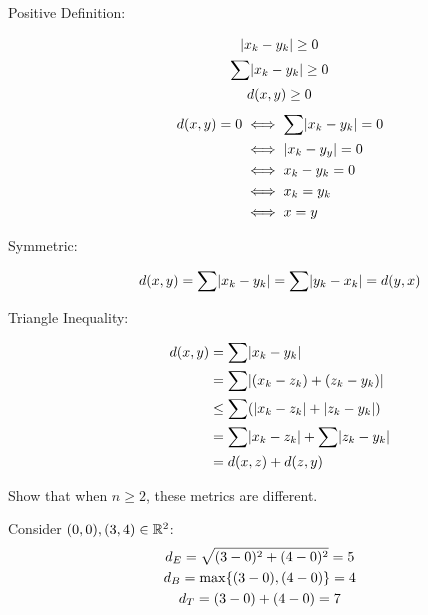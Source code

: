 \documentclass[letterpaper,12pt,fleqn]{article}
\begin{document}
\begin{examples}[Exercise 9.1]
\begin{enumerate}
    \begin{description}
    \item[Positive Definition:]
      \begin{gather*}
        \lvert x_k-y_k\rvert\ge0 \\
        \sum\lvert x_k-y_k\rvert\ge0 \\
        d(x,y)\ge0
      \end{gather*}
      \begin{align*}
        d(x,y)=0 &\iff \sum\lvert x_k-y_k\rvert=0 \\
        &\iff \lvert x_k-y_y\rvert=0 \\
        &\iff x_k-y_k=0 \\
        &\iff x_k=y_k \\
        &\iff x=y
      \end{align*}
    \item[Symmetric:]
      \[d(x,y)=\sum\lvert x_k-y_k\rvert=\sum\lvert y_k-x_k\rvert=d(y,x)\]
    \item[Triangle Inequality:]
      \begin{align*}
        d(x,y) &= \sum\lvert x_k-y_k\rvert \\
        &= \sum\lvert(x_k-z_k)+(z_k-y_k)\rvert \\
        &\le \sum(\lvert x_k-z_k\rvert+\lvert z_k-y_k\rvert) \\
        &= \sum\lvert x_k-z_k\rvert+\sum\lvert z_k-y_k\rvert \\
        &= d(x,z)+d(z,y)
      \end{align*}
    \end{description}
  \end{enumerate}

  Show that when \(n\ge2\), these metrics are different.

  Consider \((0,0),(3,4)\in\mathbb{R}^2\):
  \begin{gather*}
    d_E=\sqrt{(3-0)^2+(4-0)^2}=5 \\
    d_B=\max\{(3-0),(4-0)\}=4 \\
    d_T=(3-0)+(4-0)=7
  \end{gather*}
\end{examples}
\end{document}

